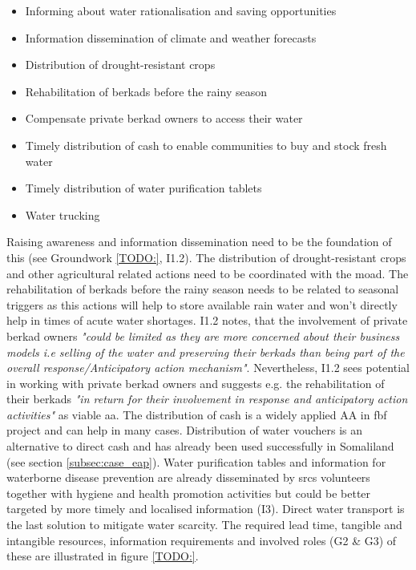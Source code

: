 \begin{itemize}
    \item Informing about water rationalisation and saving opportunities
    \item Information dissemination of climate and weather forecasts
    \item Distribution of drought-resistant crops
    \item Rehabilitation of berkads before the rainy season 
    \item Compensate private berkad owners to access their water
    \item Timely distribution of cash to enable communities to buy and stock fresh water
    \item Timely distribution of water purification tablets 
    \item Water trucking
\end{itemize}

Raising awareness and information dissemination need to be the foundation of this (see Groundwork \ref*{TODO:}, I1.2). The distribution of drought-resistant crops and other agricultural related actions need to be coordinated with the \acrfull{moad}. The rehabilitation of berkads before the rainy season needs to be related to seasonal triggers as this actions will help to store available rain water and won't directly help in times of acute water shortages. I1.2 notes, that the involvement of private berkad owners \textit{"could be limited as they are more concerned about their business models i.e selling of the water and preserving their berkads than being part of the overall response/Anticipatory action mechanism"}. Nevertheless, I1.2 sees potential in working with private berkad owners and suggests e.g. the rehabilitation of their berkads \textit{"in return for their involvement in response and anticipatory action activities"} as viable \acrshort{aa}. The distribution of cash is a widely applied AA in \acrshort{fbf} project and can help in many cases. Distribution of water vouchers is an alternative to direct cash and has already been used successfully in Somaliland (see section \ref*{subsec:case_eap}). Water purification tables and information for waterborne disease prevention are already disseminated by \acrshort{srcs} volunteers together with hygiene and health promotion activities but could be better targeted by more timely and localised information (I3). Direct water transport is the last solution to mitigate water scarcity. The required lead time, tangible and intangible resources, information requirements and involved roles (G2 \& G3) of these  are illustrated in figure \ref*{TODO:}. 

